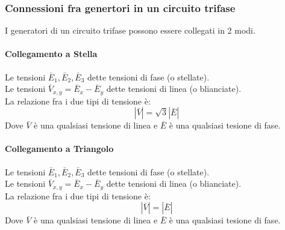 \documentclass[../main.tex]{subfiles}
\begin{document}
	\subsubsection{Connessioni fra genertori in un circuito trifase}
	I generatori di un circuito trifase possono essere collegati in 2 modi.
	\paragraph{Collegamento a Stella}
	Le tensioni $\bar E_1 , \bar E_2 , \bar E_3$ dette tensioni di fase (o stellate).\\
	Le tensioni $\bar V_{x, y} = \bar E_x - \bar E_y$ dette tensioni di linea (o blianciate).\\
	La relazione fra i due tipi di tensione è:
	\begin{equation}
		\left| \bar V \right| = \sqrt{3} \left| \bar E \right| 
	\end{equation}
	Dove $\bar V$ è una qualsiasi tensione di linea e $\bar E$ è una qualsiasi tesione di fase.
	\paragraph{Collegamento a Triangolo}
	Le tensioni $\bar E_1 , \bar E_2 , \bar E_3$ dette tensioni di fase (o stellate).\\
	Le tensioni $\bar V_{x, y} = \bar E_x - \bar E_y$ dette tensioni di linea (o blianciate).\\
	La relazione fra i due tipi di tensione è:
	\begin{equation}
		\left| \bar V \right| = \left| \bar E \right| 
	\end{equation}
	Dove $\bar V$ è una qualsiasi tensione di linea e $\bar E$ è una qualsiasi tesione di fase.
\end{document}

